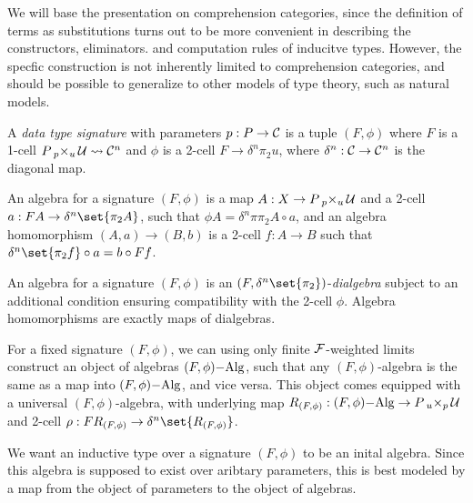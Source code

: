 \documentclass[../thesis.tex]{subfiles}
\begin{document}
We will base the presentation on comprehension categories, since the definition of terms as substitutions
turns out to be more convenient in describing the constructors, eliminators. and computation rules of
inducitve types. However, the specfic construction is not inherently limited to comprehension categories,
and should be possible to generalize to other models of type theory, such as natural models.

\begin{definition}
  A \emph{data type signature} with parameters $p : P \to \cC$ is a tuple $(F,\phi)$ where $F$ is a 1-cell
  $P \pb[p]{u} \cU \loose \cC^n$ and $\phi$ is a 2-cell $F \to \delta^n \pi_2 u$, where $\delta^n : \cC
  \to \cC^n$ is the diagonal map.

  An algebra for a signature $(F,\phi)$ is a map $A : X \to P \pb[p]{u} \cU$ and a 2-cell $a : FA \to 
  \delta^n\set{\pi_2A}$, such that $\phi A = \delta^n\pi \pi_2A \circ a$, and an algebra homomorphism
  $(A,a) \to (B,b)$ is a 2-cell $f : A \to B$ such that $\delta^n\set{\pi_2 f} \circ a = b \circ F f$.
\end{definition}
\begin{remark}
  An algebra for a signature $(F,\phi)$ is an $(F,\delta^n\set{\pi_2})$-\emph{dialgebra} subject to an
  additional condition ensuring compatibility with the 2-cell $\phi$. Algebra homomorphisms are exactly
  maps of dialgebras. 
\end{remark}

\begin{remark}
  For a fixed signature $(F,\phi)$, we can using only finite $\cF$-weighted limits construct an object
  of algebras $(F,\phi)\Alg$, such that any $(F,\phi)$-algebra is the same as a map into $(F,\phi)\Alg$,
  and vice versa. This object comes equipped with a universal $(F,\phi)$-algebra, with underlying map
  $R_{(F,\phi)} : (F,\phi) \Alg \to P \pb[u]{p} \cU$ and 2-cell $\rho : F R_{(F,\phi)} \to \delta^n\set
  {R_{(F,\phi)}}$.
\end{remark}

We want an inductive type over a signature $(F,\phi)$ to be an inital algebra. Since this algebra is supposed
to exist over aribtary parameters, this is best modeled by a map from the object of parameters to the object
of algebras.
\end{document}
